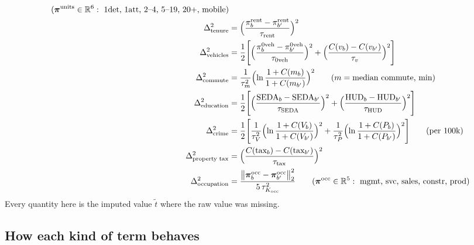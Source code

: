 \documentclass[11pt]{article}
\newcommand{\R}{\mathbb{R}}
\begin{document}
\begin{align*}
 \qquad(\boldsymbol\pi^{\text{units}}\in\R^6:\ \text{1det, 1att, 2--4, 5--19, 20+, mobile})\\
\Delta^2_{\text{tenure}}&=\Bigl(\frac{\pi^{\text{rent}}_b-\pi^{\text{rent}}_{b'}}{\tau_{\text{rent}}}\Bigr)^2\\
\Delta^2_{\text{vehicles}}&=\frac12\Biggl[
 \Bigl(\frac{\pi^{\text{0veh}}_b-\pi^{\text{0veh}}_{b'}}{\tau_{\text{0veh}}}\Bigr)^2
 +\Bigl(\frac{C(v_b)-C(v_{b'})}{\tau_v}\Bigr)^2\Biggr]\\
\Delta^2_{\text{commute}}&=\frac{1}{\tau_m^2}\Bigl(\ln\frac{1+C(m_b)}{1+C(m_{b'})}\Bigr)^2
 \qquad(m=\text{median commute, min})\\
\Delta^2_{\text{education}}&=\frac12\Biggl[
 \Bigl(\frac{\text{SEDA}_b-\text{SEDA}_{b'}}{\tau_{\text{SEDA}}}\Bigr)^2
 +\Bigl(\frac{\text{HUD}_b-\text{HUD}_{b'}}{\tau_{\text{HUD}}}\Bigr)^2\Biggr]\\
\Delta^2_{\text{crime}}&=\frac12\Biggl[
 \frac{1}{\tau_{V}^2}\Bigl(\ln\frac{1+C(V_b)}{1+C(V_{b'})}\Bigr)^2
 +\frac{1}{\tau_{P}^2}\Bigl(\ln\frac{1+C(P_b)}{1+C(P_{b'})}\Bigr)^2\Biggr]
 \qquad(\text{per }100\text{k})\\
\Delta^2_{\text{property tax}}&=\Bigl(\frac{C(\text{tax}_b)-C(\text{tax}_{b'})}{\tau_{\text{tax}}}\Bigr)^2\\
\Delta^2_{\text{occupation}}&=\frac{\bigl\|\boldsymbol\pi^{\text{occ}}_b-\boldsymbol\pi^{\text{occ}}_{b'}\bigr\|_2^2}{5\,\tau_{K_{\text{occ}}}^2}
 \qquad(\boldsymbol\pi^{\text{occ}}\in\R^5:\ \text{mgmt, svc, sales, constr, prod})
\end{align*}
Every quantity here is the imputed value $\tilde t$ where the raw value was missing.

\subsection{How each kind of term behaves}
\end{document}
